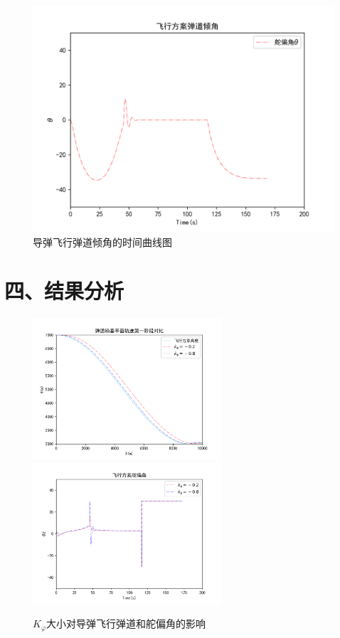 \documentclass[UTF8]{ctexart}
\begin{document}
\begin{figure}[H]
    \centering
    \includegraphics[width=130mm]{../img/飞行弹道倾角.png}
    \caption{导弹飞行弹道倾角的时间曲线图}
\end{figure}

\section*{ 四、结果分析}

\begin{figure}[H]
    \centering
    \includegraphics[width=70mm]{../img/飞行轨迹2.png}
    \includegraphics[width=70mm]{../img/飞行舵偏角2.png}
    \caption{$K_{\varphi}$大小对导弹飞行弹道和舵偏角的影响}\label{fig:k1}
\end{figure}
\end{document}
